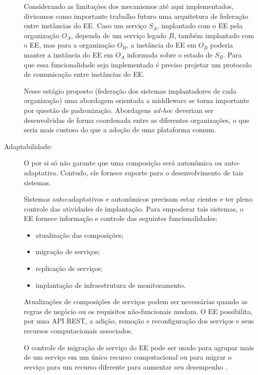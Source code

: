 \begin{description}
Considerando as limitações dos mecanismos até aqui implementados,
divisamos como importante trabalho futuro uma arquitetura de federação entre instâncias do EE.
Caso um serviço $S_A$, implantado com o EE pela organização $O_A$, dependa de um serviço legado $B$,
também implantado com o EE, mas para a organização $O_B$, a instância do EE em $O_B$ poderia
manter a instância do EE em $O_A$ informada sobre o estado de $S_B$.
Para que essa funcionalidade seja implementada é preciso projetar um protocolo
de comunicação entre instâncias do EE.

Nesse estágio proposto (federação dos sistemas implantadores de cada organização) uma abordagem
orientada a middleware se torna importante por questão de padronização.
Abordagens \emph{ad-hoc} deveriam ser desenvolvidas de forma coordenada entre as diferentes organizações,
o que seria mais custoso do que a adoção de uma plataforma comum.

\item [Adaptabilidade:]

O \ee por si só não garante que uma composição será autonômica ou auto-adaptativa.
Contudo, ele fornece suporte para o desenvolvimento de tais sistemas.

Sistemas auto-adaptativos e autonômicos precisam estar cientes
e ter pleno controle das atividades de implantação.
Para empoderar  tais sistemas, o EE fornece informação e controle
das seguintes funcionalidades:

\begin{itemize}
\item atualização das composições;
\item migração de serviços;
\item replicação de serviços;
\item implantação de infraestrutura de monitoramento.
\end{itemize}

Atualizações de composições de serviços podem ser necessárias quando
as regras de negócio ou os requisitos não-funcionais mudam.
O EE possibilita, por uma API REST, a adição, remoção e reconfiguração dos serviços
e seus recursos computacionais associados.

O controle de migração de serviço do EE pode ser usado para 
agrupar mais de um serviço em um único
recurso computacional ou para migrar o serviço para um recurso diferente
para aumentar seu desempenho .


\end{description}
